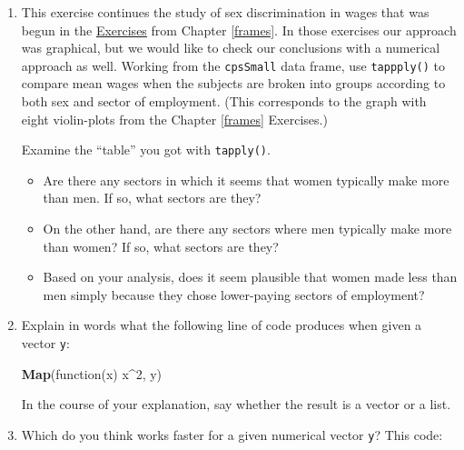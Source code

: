 \documentclass[]{book}
\makeatletter
\newenvironment{Shaded}{\begin{snugshade}}{\end{snugshade}}
\newcommand{\KeywordTok}[1]{\textcolor[rgb]{0.13,0.29,0.53}{\textbf{{#1}}}}
\newcommand{\DecValTok}[1]{\textcolor[rgb]{0.00,0.00,0.81}{{#1}}}
\newcommand{\NormalTok}[1]{{#1}}
\providecommand{\tightlist}{%
  \setlength{\itemsep}{0pt}\setlength{\parskip}{0pt}}
\newenvironment{kframe}{%
\medskip{}
\setlength{\fboxsep}{.8em}
 \def\at@end@of@kframe{}%
 \ifinner\ifhmode%
  \def\at@end@of@kframe{\end{minipage}}%
  \begin{minipage}{\columnwidth}%
 \fi\fi%
 \def\FrameCommand##1{\hskip\@totalleftmargin \hskip-\fboxsep
 \colorbox{shadecolor}{##1}\hskip-\fboxsep
     \hskip-\linewidth \hskip-\@totalleftmargin \hskip\columnwidth}%
 \MakeFramed {\advance\hsize-\width
   \@totalleftmargin\z@ \linewidth\hsize
   \@setminipage}}%
 {\par\unskip\endMakeFramed%
 \at@end@of@kframe}
\renewenvironment{Shaded}{\begin{kframe}}{\end{kframe}}
\theoremstyle{definition}
\theoremstyle{definition}
\theoremstyle{remark}
\makeatother
\begin{document}
{\begin{enumerate}
  Your task is to use \texttt{quantile()} to write a function called
  \texttt{iqRange()} that will return the interquartile range of any
  given numerical vector. Then use that function with \texttt{tapply()}
  to get the interquartile ranges for the fastest speeds in the
  \texttt{m111survey} data, where the students are broken into groups
  according to both seating preference and sex.
\item
  This exercise continues the study of sex discrimination in wages that
  was begun in the \protect\hyperlink{frames-exercises}{Exercises} from
  Chapter \ref{frames}. In those exercises our approach was graphical,
  but we would like to check our conclusions with a numerical approach
  as well. Working from the \texttt{cpsSmall} data frame, use
  \texttt{tappply()} to compare mean wages when the subjects are broken
  into groups according to both sex and sector of employment. (This
  corresponds to the graph with eight violin-plots from the Chapter
  \ref{frames} Exercises.)

  Examine the ``table'' you got with \texttt{tapply()}.

  \begin{itemize}
  \tightlist
  \item
    Are there any sectors in which it seems that women typically make
    more than men. If so, what sectors are they?
  \item
    On the other hand, are there any sectors where men typically make
    more than women? If so, what sectors are they?
  \item
    Based on your analysis, does it seem plausible that women made less
    than men simply because they chose lower-paying sectors of
    employment?
  \end{itemize}
\item
  Explain in words what the following line of code produces when given a
  vector \texttt{y}:

\begin{Shaded}
\begin{Highlighting}[]
\KeywordTok{Map}\NormalTok{(function(x) x^}\DecValTok{2}\NormalTok{, y)}
\end{Highlighting}
\end{Shaded}

  In the course of your explanation, say whether the result is a vector
  or a list.
\item
  Which do you think works faster for a given numerical vector
  \texttt{y}? This code:


\end{enumerate}}
\end{document}
